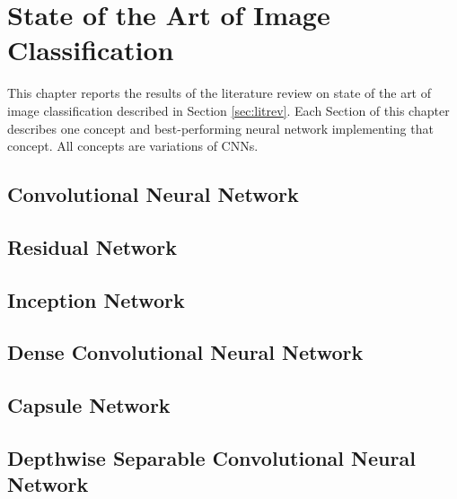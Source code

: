 \chapter{State of the Art of Image Classification}
\label{chp:sota}
This chapter reports the results of the literature review on state of the art of image classification described in Section \ref{sec:litrev}. Each Section of this chapter describes one concept and best-performing neural network implementing that concept. All concepts are variations of \ac{CNN}s.


\section{Convolutional Neural Network}
\label{sec:conv}


\section{Residual Network}
\label{sec:res}


\section{Inception Network}
\label{sec:inception}


\section{Dense Convolutional Neural Network}
\label{sec:dense}


\section{Capsule Network}
\label{sec:capsule}


\section{Depthwise Separable Convolutional Neural Network}
\label{sec:sepconv}
